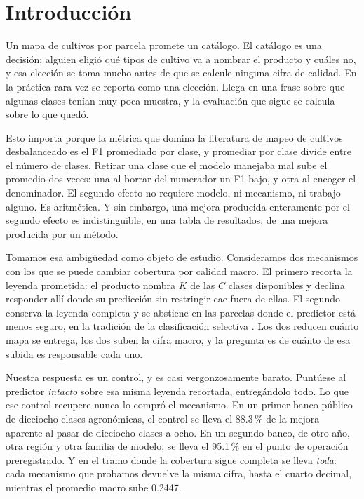 \section{Introducción}
\label{sec:introduccion}

Un mapa de cultivos por parcela promete un catálogo. El catálogo es una decisión: alguien eligió
qué tipos de cultivo va a nombrar el producto y cuáles no, y esa elección se toma mucho antes de
que se calcule ninguna cifra de calidad. En la práctica rara vez se reporta como una elección.
Llega en una frase sobre que algunas clases tenían muy poca muestra, y la evaluación que sigue se
calcula sobre lo que quedó.

Esto importa porque la métrica que domina la literatura de mapeo de cultivos desbalanceado es el
F1 promediado por clase, y promediar por clase divide entre el número de clases. Retirar una clase
que el modelo manejaba mal sube el promedio dos veces: una al borrar del numerador un F1 bajo, y
otra al encoger el denominador. El segundo efecto no requiere modelo, ni mecanismo, ni trabajo
alguno. Es aritmética. Y sin embargo, una mejora producida enteramente por el segundo efecto es
indistinguible, en una tabla de resultados, de una mejora producida por un método.

Tomamos esa ambigüedad como objeto de estudio. Consideramos dos mecanismos con los que se puede
cambiar cobertura por calidad macro. El primero recorta la leyenda prometida: el producto nombra
$K$ de las $C$ clases disponibles y declina responder allí donde su predicción sin restringir cae
fuera de ellas. El segundo conserva la leyenda completa y se abstiene en las parcelas donde el
predictor está menos seguro, en la tradición de la clasificación selectiva
\cite{chow1970reject,geifman2017selective}. Los dos reducen cuánto mapa se entrega, los dos suben
la cifra macro, y la pregunta es de cuánto de esa subida es responsable cada uno.

Nuestra respuesta es un control, y es casi vergonzosamente barato. Puntúese al predictor
\emph{intacto} sobre esa misma leyenda recortada, entregándolo todo. Lo que ese control recupere
nunca lo compró el mecanismo. En un primer banco público de dieciocho clases agronómicas, el
control se lleva el \num{88.3}\,\% de la mejora aparente al pasar de dieciocho clases a ocho. En
un segundo banco, de otro año, otra región y otra familia de modelo, se lleva el \num{95.1}\,\% en
el punto de operación preregistrado. Y en el tramo donde la cobertura sigue completa se lleva
\emph{toda}: cada mecanismo que probamos devuelve la misma cifra, hasta el cuarto decimal, mientras
el promedio macro sube \num{0.2447}.

